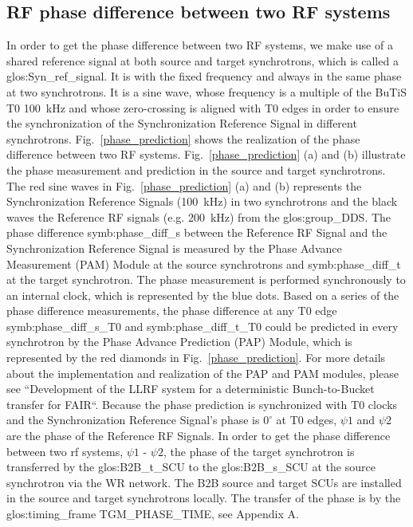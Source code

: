 \subsection{RF phase difference between two RF systems}
In order to get the phase difference between two RF systems, we make use of a shared reference signal at both source and target synchrotrons, which is called a \gls{glos:Syn_ref_signal}. It is with the fixed frequency and always in the same phase at two synchrotrons. It is a sine wave, whose frequency is a multiple of the BuTiS T0 \SI{100}{kHz} and whose zero-crossing is aligned with T0 edges in order to ensure the synchronization of the Synchronization Reference Signal in different synchrotrons. Fig.~\ref{phase_prediction} shows the realization of the phase difference between two RF systems. Fig.~\ref{phase_prediction} (a) and (b) illustrate the phase measurement and prediction in the source and target synchrotrons. The red sine waves in Fig.~\ref{phase_prediction} (a) and (b) represents the Synchronization Reference Signals (\SI{100}{kHz}) in two synchrotrons and the black waves the Reference RF signals (e.g. \SI{200}{kHz}) from the \gls{glos:group_DDS}. The phase difference \gls{symb:phase_diff_s} between the Reference RF Signal and the Synchronization Reference Signal is measured by the Phase Advance Measurement (\gls{PAM}) Module at the source synchrotrons and \gls{symb:phase_diff_t} at the target synchrotron. The phase measurement is performed synchronously to an internal clock, which is represented by the blue dots. Based on a series of the phase difference measurements, the phase difference at any T0 edge \gls{symb:phase_diff_s_T0} and \gls{symb:phase_diff_t_T0} could be predicted in every synchrotron by the Phase Advance Prediction (\gls{PAP}) Module, which is represented by the red diamonds in Fig.~\ref{phase_prediction}. For more details about the implementation and realization of the PAP and PAM modules, please see ``Development of the LLRF system for a deterministic Bunch-to-Bucket transfer for FAIR``. Because the phase prediction is synchronized with T0 clocks and the Synchronization Reference Signal's phase is $0^\circ$ at T0 edges, $\psi1$ and $\psi2$ are the phase of the Reference RF Signals. In order to get the phase difference between two rf systems, $\psi1$ - $\psi2$, the phase of the target synchrotron is transferred by the \gls{glos:B2B_t_SCU} to the \gls{glos:B2B_s_SCU} at the source synchrotron via the WR network. The B2B source and target SCUs are installed in the source and target synchrotrons locally. The transfer of the phase is by the \gls{glos:timing_frame} TGM\_PHASE\_TIME, see Appendix A.

